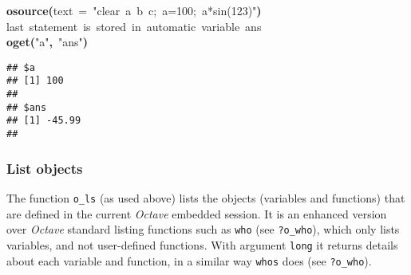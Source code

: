 \documentclass[english,10pt,a4paper]{article}\usepackage{graphicx, color}
\makeatletter
\newcommand{\hlfunctioncall}[1]{\textcolor[rgb]{0.501960784313725,0,0.329411764705882}{\textbf{#1}}}%
\newcommand{\hlstring}[1]{\textcolor[rgb]{0.6,0.6,1}{#1}}%
\newcommand{\hlkeyword}[1]{\textcolor[rgb]{0,0,0}{\textbf{#1}}}%
\newcommand{\hlargument}[1]{\textcolor[rgb]{0.690196078431373,0.250980392156863,0.0196078431372549}{#1}}%
\newcommand{\hlcomment}[1]{\textcolor[rgb]{0.180392156862745,0.6,0.341176470588235}{#1}}%
\newcommand{\hlstd}[1]{\textcolor[rgb]{0,0,0}{#1}}%
\newenvironment{kframe}{%
 \def\FrameCommand##1{\hskip\@totalleftmargin \hskip-\fboxsep
 \colorbox{shadecolor}{##1}\hskip-\fboxsep
     \hskip-\linewidth \hskip-\@totalleftmargin \hskip\columnwidth}%
 \MakeFramed {\advance\hsize-\width
   \@totalleftmargin\z@ \linewidth\hsize
   \@setminipage}}%
 {\par\unskip\endMakeFramed}
\newenvironment{knitrout}{}{} %
\let\proglang=\textit
\let\code=\texttt
\newcommand{\octave}{\proglang{Octave}\xspace}
\makeatother
\begin{document}
\begin{knitrout}
\color{fgcolor}\begin{kframe}
\begin{flushleft}
\ttfamily\noindent
\hlfunctioncall{o\usebox{\hlnormalsizeboxunderscore}source}\hlkeyword{(}\hlargument{text}{\ }\hlargument{=}{\ }\hlstring{"{}clear{\ }a{\ }b{\ }c;{\ }a=100;{\ }a*sin(123)"{}}\hlkeyword{)}\hspace*{\fill}\\
\hlstd{}\hlcomment{\usebox{\hlnormalsizeboxhash}{\ }last{\ }statement{\ }is{\ }stored{\ }in{\ }automatic{\ }variable{\ }\usebox{\hlnormalsizeboxsinglequote}ans\usebox{\hlnormalsizeboxsinglequote}}\hspace*{\fill}\\
\hlstd{}\hlfunctioncall{o\usebox{\hlnormalsizeboxunderscore}get}\hlkeyword{(}\hlstring{"{}a"{}}\hlkeyword{,}{\ }\hlstring{"{}ans"{}}\hlkeyword{)}\mbox{}
\normalfont
\end{flushleft}
\begin{verbatim}
## $a
## [1] 100
## 
## $ans
## [1] -45.99
## 
\end{verbatim}
\end{kframe}
\end{knitrout}


\subsubsection{List objects}

The function \code{o\_ls} (as used above) lists the objects (variables and
functions) that are defined in the current \octave embedded session.
It is an enhanced version over \octave standard listing functions such as
\code{who} (see \code{?o\_who}), which only lists variables, and not
user-defined functions.
With argument \code{long} it returns details about each variable and function,
in a similar way \code{whos} does (see \code{?o\_who}).
\end{document}
